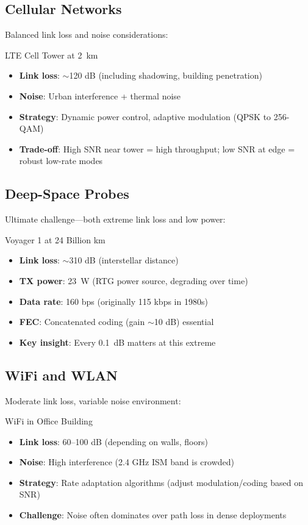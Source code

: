 \subsection{Cellular Networks}

Balanced link loss and noise considerations:

\begin{calloutbox}{LTE Cell Tower at 2~km}
\begin{itemize}
\item \textbf{Link loss}: $\sim$120 dB (including shadowing, building penetration)
\item \textbf{Noise}: Urban interference + thermal noise
\item \textbf{Strategy}: Dynamic power control, adaptive modulation (QPSK to 256-QAM)
\item \textbf{Trade-off}: High SNR near tower = high throughput; low SNR at edge = robust low-rate modes
\end{itemize}
\end{calloutbox}

\subsection{Deep-Space Probes}

Ultimate challenge---both extreme link loss and low power:

\begin{calloutbox}{Voyager 1 at 24 Billion km}
\begin{itemize}
\item \textbf{Link loss}: $\sim$310 dB (interstellar distance)
\item \textbf{TX power}: 23~W (RTG power source, degrading over time)
\item \textbf{Data rate}: 160 bps (originally 115 kbps in 1980s)
\item \textbf{FEC}: Concatenated coding (gain $\sim$10 dB) essential
\item \textbf{Key insight}: Every 0.1~dB matters at this extreme
\end{itemize}
\end{calloutbox}

\subsection{WiFi and WLAN}

Moderate link loss, variable noise environment:

\begin{calloutbox}{WiFi in Office Building}
\begin{itemize}
\item \textbf{Link loss}: 60--100 dB (depending on walls, floors)
\item \textbf{Noise}: High interference (2.4 GHz ISM band is crowded)
\item \textbf{Strategy}: Rate adaptation algorithms (adjust modulation/coding based on SNR)
\item \textbf{Challenge}: Noise often dominates over path loss in dense deployments
\end{itemize}
\end{calloutbox}

